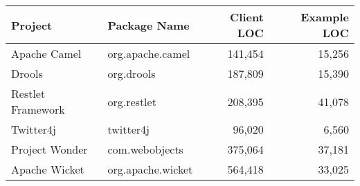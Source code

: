 \begin{tabular}{llrr}
\toprule
Project & Package Name & Client LOC & Example LOC\\
\midrule
Apache Camel & org.apache.camel & 141,454 & 15,256 \\
Drools & org.drools & 187,809 & 15,390 \\
Restlet Framework & org.restlet & 208,395 & 41,078 \\
Twitter4j & twitter4j & 96,020 & 6,560 \\
Project Wonder & com.webobjects & 375,064 & 37,181 \\
Apache Wicket & org.apache.wicket & 564,418 & 33,025 \\
\bottomrule
\end{tabular}